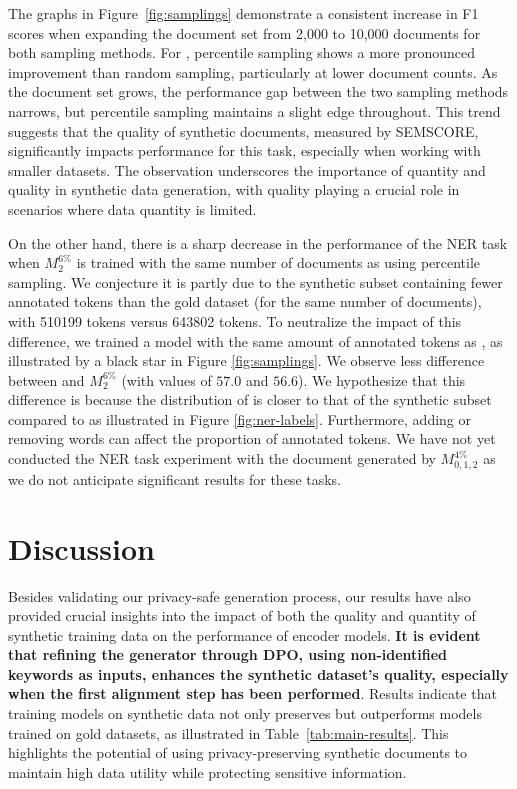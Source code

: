 The graphs in Figure~\ref{fig:samplings} demonstrate a consistent increase in F1 scores when expanding the document set from 2,000 to 10,000 documents for both sampling methods. For , percentile sampling shows a more pronounced improvement than random sampling, particularly at lower document counts. As the document set grows, the performance gap between the two sampling methods narrows, but percentile sampling maintains a slight edge throughout. This trend suggests that the quality of synthetic documents, measured by SEMSCORE, significantly impacts performance for this task, especially when working with smaller datasets. The observation underscores the importance of quantity and quality in synthetic data generation, with quality playing a crucial role in scenarios where data quantity is limited.

On the other hand, there is a sharp decrease in the performance of the NER task when $M_{2}^{6\%}$ is trained with the same number of documents as \mgold using percentile sampling. We conjecture it is partly due to the synthetic subset containing fewer annotated tokens than the gold dataset (for the same number of documents), with 510199 tokens versus 643802 tokens. To neutralize the impact of this difference, we trained a model with the same amount of annotated tokens as \dgold, as illustrated by a black star in Figure \ref{fig:samplings}. We observe less difference between \mgold and $M_{2}^{6\%}$ (with values of $57.0$ and $56.6$). We hypothesize that this difference is because the distribution of \dgold is closer to that of the synthetic subset compared to \dte as illustrated in Figure \ref{fig:ner-labels}. Furthermore, adding or removing words can affect the proportion of annotated tokens. We have not yet conducted the NER task experiment with the document generated by $M_{0,1,2}^{4\%}$ as we do not anticipate significant results for these tasks.

\section{Discussion}

Besides validating our privacy-safe generation process, our results have also provided crucial insights into the impact of both the quality and quantity of synthetic training data on the performance of encoder models. \textbf{It is evident that refining the generator through DPO, using non-identified keywords as inputs, enhances the synthetic dataset's quality, especially when the first alignment step has been performed}.
Results indicate that training models on synthetic data not only preserves but outperforms models trained on gold datasets, as illustrated in Table~\ref{tab:main-results}.
This highlights the potential of using privacy-preserving synthetic documents to maintain high data utility while protecting sensitive information. 

